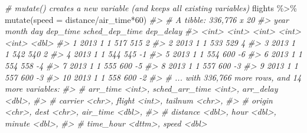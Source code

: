 \documentclass[
]{book}
\newenvironment{Shaded}{\begin{snugshade}}{\end{snugshade}}
\newcommand{\AttributeTok}[1]{\textcolor[rgb]{0.77,0.63,0.00}{#1}}
\newcommand{\CommentTok}[1]{\textcolor[rgb]{0.56,0.35,0.01}{\textit{#1}}}
\newcommand{\DecValTok}[1]{\textcolor[rgb]{0.00,0.00,0.81}{#1}}
\newcommand{\FunctionTok}[1]{\textcolor[rgb]{0.00,0.00,0.00}{#1}}
\newcommand{\NormalTok}[1]{#1}
\newcommand{\SpecialCharTok}[1]{\textcolor[rgb]{0.00,0.00,0.00}{#1}}
\begin{document}
\begin{Shaded}
\begin{Highlighting}[]
\CommentTok{\# mutate() creates a new variable (and keeps all existing variables)}
\NormalTok{flights }\SpecialCharTok{\%\textgreater{}\%} \FunctionTok{mutate}\NormalTok{(}\AttributeTok{speed =}\NormalTok{ distance}\SpecialCharTok{/}\NormalTok{air\_time}\SpecialCharTok{*}\DecValTok{60}\NormalTok{)}
\CommentTok{\#\textgreater{} \# A tibble: 336,776 x 20}
\CommentTok{\#\textgreater{}     year month   day dep\_time sched\_dep\_time dep\_delay}
\CommentTok{\#\textgreater{}    \textless{}int\textgreater{} \textless{}int\textgreater{} \textless{}int\textgreater{}    \textless{}int\textgreater{}          \textless{}int\textgreater{}     \textless{}dbl\textgreater{}}
\CommentTok{\#\textgreater{}  1  2013     1     1      517            515         2}
\CommentTok{\#\textgreater{}  2  2013     1     1      533            529         4}
\CommentTok{\#\textgreater{}  3  2013     1     1      542            540         2}
\CommentTok{\#\textgreater{}  4  2013     1     1      544            545        {-}1}
\CommentTok{\#\textgreater{}  5  2013     1     1      554            600        {-}6}
\CommentTok{\#\textgreater{}  6  2013     1     1      554            558        {-}4}
\CommentTok{\#\textgreater{}  7  2013     1     1      555            600        {-}5}
\CommentTok{\#\textgreater{}  8  2013     1     1      557            600        {-}3}
\CommentTok{\#\textgreater{}  9  2013     1     1      557            600        {-}3}
\CommentTok{\#\textgreater{} 10  2013     1     1      558            600        {-}2}
\CommentTok{\#\textgreater{} \# ... with 336,766 more rows, and 14 more variables:}
\CommentTok{\#\textgreater{} \#   arr\_time \textless{}int\textgreater{}, sched\_arr\_time \textless{}int\textgreater{}, arr\_delay \textless{}dbl\textgreater{},}
\CommentTok{\#\textgreater{} \#   carrier \textless{}chr\textgreater{}, flight \textless{}int\textgreater{}, tailnum \textless{}chr\textgreater{},}
\CommentTok{\#\textgreater{} \#   origin \textless{}chr\textgreater{}, dest \textless{}chr\textgreater{}, air\_time \textless{}dbl\textgreater{},}
\CommentTok{\#\textgreater{} \#   distance \textless{}dbl\textgreater{}, hour \textless{}dbl\textgreater{}, minute \textless{}dbl\textgreater{},}
\CommentTok{\#\textgreater{} \#   time\_hour \textless{}dttm\textgreater{}, speed \textless{}dbl\textgreater{}}


\end{Highlighting}
\end{Shaded}
\end{document}

